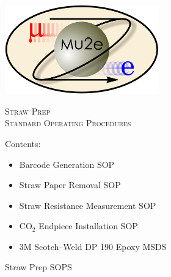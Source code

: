 \documentclass[letterpaper,12pt]{article}
\begin{document}
\begin{titlepage}
	\centering
	\includegraphics[width=0.5\textwidth]{mu2e_logo_oval}\par\vspace{2cm}
	{\scshape\LARGE Straw Prep \\
		Standard Operating Procedures\par}
	\vspace{3cm}

	{\large Contents:
	\begin{itemize}
	\item Barcode Generation SOP
	\item Straw Paper Removal SOP
	\item Straw Resistance Measurement SOP
	\item $\mathrm{CO}_2$ Endpiece Installation SOP
	\item 3M Scotch--Weld DP 190 Epoxy MSDS
	\end{itemize}
	}
	
	
\end{titlepage}

\newpage
\medskip
{\Large Straw Prep SOPS}
\end{document}
